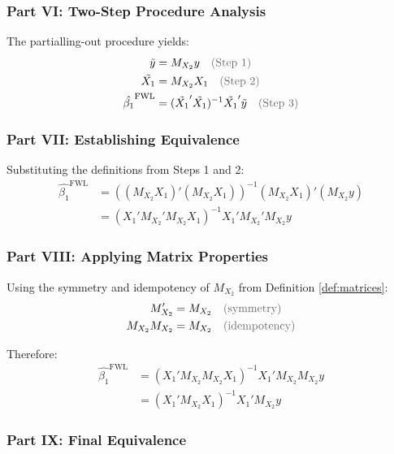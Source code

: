 \documentclass[11pt,letterpaper]{article}
\makeatletter
\theoremstyle{definition}
\renewenvironment{proof}[1][\proofname]{\par
  \pushQED{\qed}%
  \normalfont \topsep6\p@\@plus6\p@\relax
  \trivlist
  \item[\hskip\labelsep
        \itshape\bfseries\color{accentblue}
    #1\@addpunct{.}]\ignorespaces
}{%
  \popQED\endtrivlist\@endpefalse
}
\makeatother
\begin{document}
\begin{proof}
\subsubsection*{\textcolor{primaryblue}{Part VI: Two-Step Procedure Analysis}}

The partialling-out procedure yields:
\begin{align}
\tilde{y} &= M_{X_2}y \quad \text{\textcolor{lightgray}{(Step 1)}} \\
\tilde{X_1} &= M_{X_2}X_1 \quad \text{\textcolor{lightgray}{(Step 2)}} \\
\hat{\beta_1}^{\text{FWL}} &= (\tilde{X_1}'\tilde{X_1})^{-1}\tilde{X_1}'\tilde{y} \quad \text{\textcolor{lightgray}{(Step 3)}} \label{eq:beta1_fwl}
\end{align}

\subsubsection*{\textcolor{primaryblue}{Part VII: Establishing Equivalence}}

Substituting the definitions from Steps 1 and 2:
\begin{align}
\hat{\beta_1}^{\text{FWL}} &= ((M_{X_2}X_1)'(M_{X_2}X_1))^{-1}(M_{X_2}X_1)'(M_{X_2}y) \\
&= (X_1'M_{X_2}'M_{X_2}X_1)^{-1}X_1'M_{X_2}'M_{X_2}y \label{eq:substitution}
\end{align}

\subsubsection*{\textcolor{primaryblue}{Part VIII: Applying Matrix Properties}}

Using the symmetry and idempotency of $M_{X_2}$ from Definition \ref{def:matrices}:
\begin{align}
M_{X_2}' &= M_{X_2} \quad \text{\textcolor{lightgray}{(symmetry)}} \\
M_{X_2}M_{X_2} &= M_{X_2} \quad \text{\textcolor{lightgray}{(idempotency)}}
\end{align}

Therefore:
\begin{align}
\hat{\beta_1}^{\text{FWL}} &= (X_1'M_{X_2}M_{X_2}X_1)^{-1}X_1'M_{X_2}M_{X_2}y \\
&= (X_1'M_{X_2}X_1)^{-1}X_1'M_{X_2}y \label{eq:final_fwl}
\end{align}

\subsubsection*{\textcolor{primaryblue}{Part IX: Final Equivalence}}


\end{proof}
\end{document}
